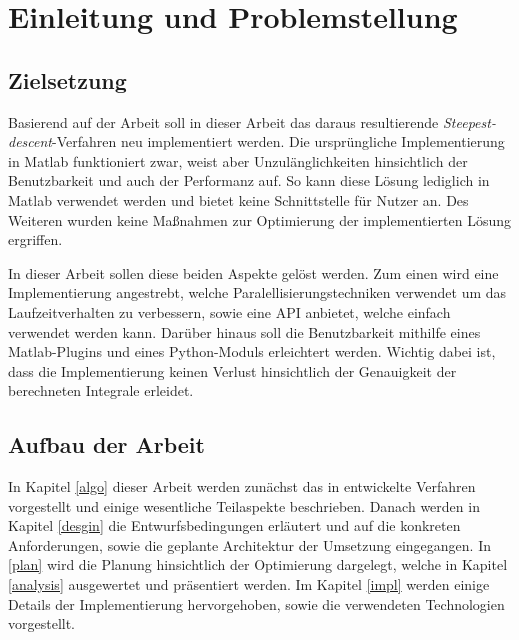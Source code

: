 \chapter{Einleitung und Problemstellung}


\section{Zielsetzung}

Basierend auf der Arbeit \cite{gasperini:hal-03209144} soll in dieser Arbeit das daraus resultierende \textit{Steepest-descent}-Verfahren neu implementiert werden.
Die ursprüngliche Implementierung in Matlab funktioniert zwar, weist aber Unzulänglichkeiten hinsichtlich der Benutzbarkeit und auch der Performanz auf.
So kann diese Lösung lediglich in Matlab verwendet werden und bietet keine Schnittstelle für Nutzer an. Des Weiteren wurden keine Maßnahmen zur Optimierung der implementierten Lösung ergriffen.

In dieser Arbeit sollen diese beiden Aspekte gelöst werden. Zum einen wird eine Implementierung angestrebt, welche Paralellisierungstechniken verwendet um das Laufzeitverhalten zu verbessern, sowie eine API anbietet, welche einfach verwendet werden kann.
Darüber hinaus soll die Benutzbarkeit mithilfe eines Matlab-Plugins und eines Python-Moduls erleichtert werden.
Wichtig dabei ist, dass die Implementierung keinen Verlust hinsichtlich der Genauigkeit der berechneten Integrale erleidet.



\section{Aufbau der Arbeit}

In Kapitel \ref{algo} dieser Arbeit werden zunächst das in \cite{gasperini:hal-03209144} entwickelte Verfahren vorgestellt und einige wesentliche Teilaspekte beschrieben.
Danach werden in Kapitel \ref{desgin} die Entwurfsbedingungen erläutert und auf die konkreten Anforderungen, sowie die geplante Architektur der Umsetzung eingegangen.
In \ref{plan} wird die Planung hinsichtlich der Optimierung dargelegt, welche in Kapitel \ref{analysis} ausgewertet und präsentiert werden.
Im Kapitel \ref{impl} werden einige Details der Implementierung hervorgehoben, sowie die verwendeten Technologien vorgestellt.